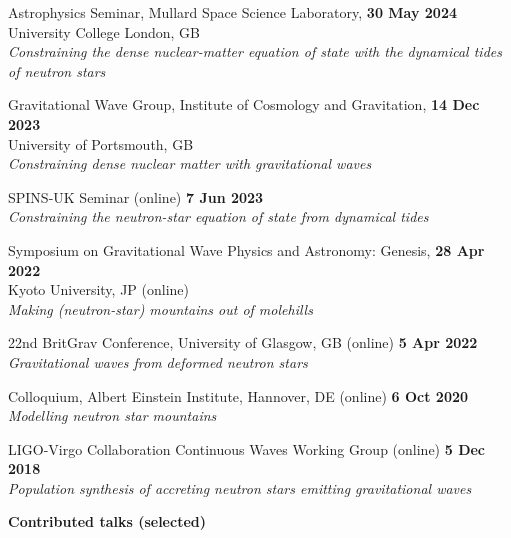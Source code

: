 \begin{etaremune}
    \item Astrophysics Seminar, Mullard Space Science Laboratory,
    \hfill \textbf{30 May 2024} \\
    University College London, GB \\
    \textit{Constraining the dense nuclear-matter equation of state with the dynamical tides of neutron stars}
    \item Gravitational Wave Group, Institute of Cosmology and Gravitation,
    \hfill \textbf{14 Dec 2023} \\
    University of Portsmouth, GB \\
    \textit{Constraining dense nuclear matter with gravitational waves}
    \item SPINS-UK Seminar (online)
    \hfill \textbf{7 Jun 2023} \\
    \textit{Constraining the neutron-star equation of state from dynamical tides}
    \item Symposium on Gravitational Wave Physics and Astronomy: Genesis,
    \hfill \textbf{28 Apr 2022} \\
    Kyoto University, JP (online) \\
    \textit{Making (neutron-star) mountains out of molehills}
    \item 22nd BritGrav Conference, University of Glasgow, GB (online)
    \hfill \textbf{5 Apr 2022} \\
    \textit{Gravitational waves from deformed neutron stars}
    \item Colloquium, Albert Einstein Institute, Hannover, DE (online)
    \hfill \textbf{6 Oct 2020} \\
    \textit{Modelling neutron star mountains}
    \item LIGO-Virgo Collaboration Continuous Waves Working Group (online)
    \hfill \textbf{5 Dec 2018} \\
    \textit{Population synthesis of accreting neutron stars emitting gravitational waves}
\end{etaremune}

\textbf{Contributed talks (selected)}

